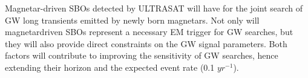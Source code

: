 Magnetar-driven SBOs detected by ULTRASAT will have for the joint search of GW long transients emitted by newly born magnetars. Not only will magnetardriven SBOs represent a necessary EM trigger for GW searches, but they will also provide direct constraints on the GW signal parameters. Both factors will contribute to improving the sensitivity of GW searches, hence extending their horizon and the expected event rate (0.1  $ yr^{-1}$).\\


